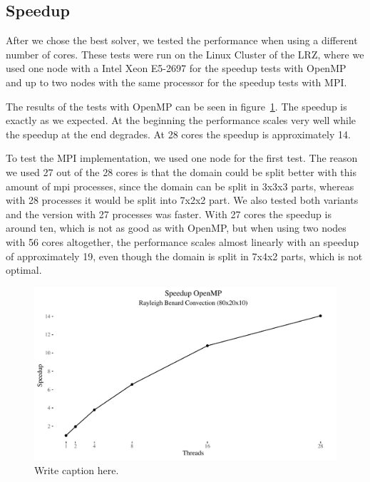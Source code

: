 \documentclass{article}%
\begin{document}
\subsection{Speedup}
After we chose the best solver, we tested the performance when using a different number of cores. These tests were run on the Linux Cluster of the LRZ, where we used one node with a Intel Xeon E5-2697 for the speedup tests with OpenMP and up to two nodes with the same processor for the speedup tests with MPI.

The results of the tests with OpenMP can be seen in figure~\ref{fig:speedup_openmp}. The speedup is exactly as we expected. At the beginning the performance scales very well while the speedup at the end degrades. At 28 cores the speedup is approximately 14.

To test the MPI implementation, we used one node for the first test. The reason we used 27 out of the 28 cores is that the domain could be split better with this amount of mpi processes, since the domain can be split in 3x3x3 parts, whereas with 28 processes it would be split into 7x2x2 part. We also tested both variants and the version with 27 processes was faster. With 27 cores the speedup is around ten, which is not as good as with OpenMP, but when using two nodes with 56 cores altogether, the performance scales almost linearly with an speedup of approximately 19, even though the domain is split in 7x4x2 parts, which is not optimal.


\begin{figure}[htb]
\centering
\includegraphics[width=1\linewidth]{../tests/graphs/speedup_OpenMP_double.pdf}
\caption{Write caption here.}
\label{fig:speedup_openmp}
\end{figure}
\end{document}
